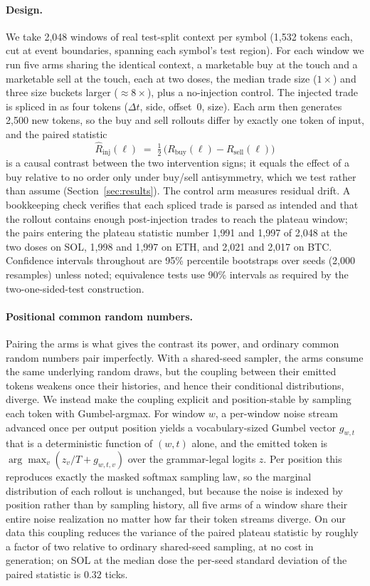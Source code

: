 \documentclass[11pt]{article}
\begin{document}
\paragraph{Design.} We take 2{,}048 windows of real test-split context per symbol (1,532 tokens each, cut at event boundaries, spanning each symbol's test region). For each window we run five arms sharing the identical context, a marketable buy at the touch and a marketable sell at the touch, each at two doses, the median trade size ($1\times$) and three size buckets larger ($\approx 8\times$), plus a no-injection control. The injected trade is spliced in as four tokens ($\Delta t$, side, offset~0, size). Each arm then generates 2,500 new tokens, so the buy and sell rollouts differ by exactly one token of input, and the paired statistic
\[
\hat{R}_{\mathrm{inj}}(\ell) \;=\; \tfrac{1}{2}\,\big(R_{\mathrm{buy}}(\ell) - R_{\mathrm{sell}}(\ell)\big)
\]
is a causal contrast between the two intervention signs; it equals the effect of a buy relative to no order only under buy/sell antisymmetry, which we test rather than assume (Section~\ref{sec:results}). The control arm measures residual drift. A bookkeeping check verifies that each spliced trade is parsed as intended and that the rollout contains enough post-injection trades to reach the plateau window; the pairs entering the plateau statistic number 1{,}991 and 1{,}997 of 2{,}048 at the two doses on SOL, 1{,}998 and 1{,}997 on ETH, and 2{,}021 and 2{,}017 on BTC. Confidence intervals throughout are 95\% percentile bootstraps over seeds (2{,}000 resamples) unless noted; equivalence tests use 90\% intervals as required by the two-one-sided-test construction.

\paragraph{Positional common random numbers.} Pairing the arms is what gives the contrast its power, and ordinary common random numbers pair imperfectly. With a shared-seed sampler, the arms consume the same underlying random draws, but the coupling between their emitted tokens weakens once their histories, and hence their conditional distributions, diverge. We instead make the coupling explicit and position-stable by sampling each token with Gumbel-argmax. For window $w$, a per-window noise stream advanced once per output position yields a vocabulary-sized Gumbel vector $g_{w,t}$ that is a deterministic function of $(w,t)$ alone, and the emitted token is $\arg\max_v (z_v/T + g_{w,t,v})$ over the grammar-legal logits $z$. Per position this reproduces exactly the masked softmax sampling law, so the marginal distribution of each rollout is unchanged, but because the noise is indexed by position rather than by sampling history, all five arms of a window share their entire noise realization no matter how far their token streams diverge. On our data this coupling reduces the variance of the paired plateau statistic by roughly a factor of two relative to ordinary shared-seed sampling, at no cost in generation; on SOL at the median dose the per-seed standard deviation of the paired statistic is $0.32$ ticks.
\end{document}

